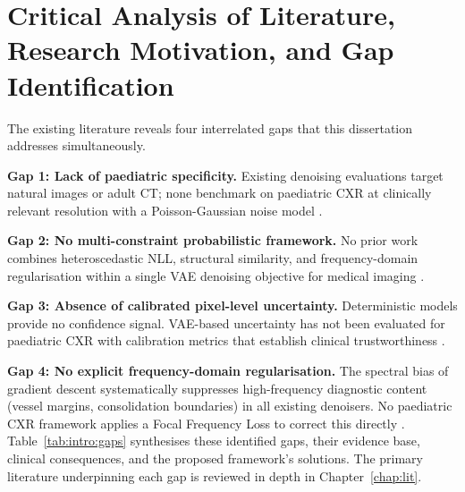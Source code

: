 \documentclass[12pt, a4paper, twoside, openright]{book}
\begin{document}
\section{Critical Analysis of Literature, Research Motivation, and Gap Identification}
\label{sec:intro:gap}

The existing literature reveals four interrelated gaps that this dissertation addresses simultaneously.

\textbf{Gap 1: Lack of paediatric specificity.} Existing denoising evaluations target natural images or adult CT; none benchmark on paediatric CXR at clinically relevant resolution with a Poisson-Gaussian noise model \cite{laborie_scoping_2026, yang_medmnist_2023}.

\textbf{Gap 2: No multi-constraint probabilistic framework.} No prior work combines heteroscedastic NLL, structural similarity, and frequency-domain regularisation within a single VAE denoising objective for medical imaging \cite{bredell_explicitly_2023, zhao_loss_2017}.

\textbf{Gap 3: Absence of calibrated pixel-level uncertainty.} Deterministic models provide no confidence signal. VAE-based uncertainty has not been evaluated for paediatric CXR with calibration metrics that establish clinical trustworthiness \cite{kendall_what_2017}.

\textbf{Gap 4: No explicit frequency-domain regularisation.} The spectral bias of gradient descent \cite{rahaman_spectral_2019, xu_frequency_2020} systematically suppresses high-frequency diagnostic content (vessel margins, consolidation boundaries) in all existing denoisers. No paediatric CXR framework applies a Focal Frequency Loss \cite{jiang_focal_2021} to correct this directly \cite{durall_watch_2020}.
Table~\ref{tab:intro:gaps} synthesises these identified gaps, their evidence base, clinical
consequences, and the proposed framework's solutions. The primary literature underpinning
each gap is reviewed in depth in Chapter~\ref{chap:lit}.
\end{document}
